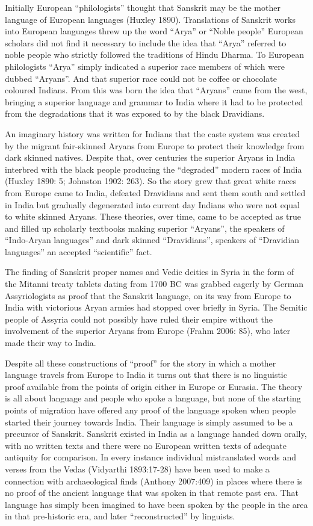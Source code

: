Initially European “philologists” thought that Sanskrit may be the mother language of European languages (Huxley 1890). Translations of Sanskrit works into European languages threw up the word “Arya” or “Noble people” European scholars did not find it necessary to include the idea that “Arya” referred to noble people who strictly followed the traditions of Hindu Dharma. To European philologists “Arya” simply indicated a superior race members of which were dubbed “Aryans”. And that superior race could not be coffee or chocolate coloured Indians. From this was born the idea that “Aryans” came from the west, bringing a superior language and grammar to India where it had to be protected from the degradations that it was exposed to by the black Dravidians. 

\newpage

An imaginary history was written for Indians that the caste system was created by the migrant fair-skinned Aryans from Europe to protect their knowledge from dark skinned natives. Despite that, over centuries the superior Aryans in India interbred with the black people producing the “degraded” modern races of India (Huxley 1890: 5; Johnston 1902: 263). So the story grew that great white races from Europe came to India, defeated Dravidians and sent them south and settled in India but gradually degenerated into current day Indians who were not equal to white skinned Aryans. These theories, over time, came to be accepted as true and filled up scholarly textbooks making superior “Aryans”, the speakers of “Indo-Aryan languages” and dark skinned “Dravidians”, speakers of “Dravidian languages” an accepted “scientific” fact.

The finding of Sanskrit proper names and Vedic deities in Syria in the form of the Mitanni treaty tablets dating from 1700 BC was grabbed eagerly by German Assyriologists as proof that the Sanskrit language, on its way from Europe to India with victorious Aryan armies had stopped over briefly in Syria. The Semitic people of Assyria could not possibly have ruled their empire without the involvement of the superior Aryans from Europe (Frahm 2006: 85), who later made their way to India.

Despite all these constructions of “proof” for the story in which a mother language travels from Europe to India it turns out that there is no linguistic proof available from the points of origin either in Europe or Eurasia. The theory is all about language and people who spoke a language, but none of the starting points of migration have offered any proof of the language spoken when people started their journey towards India. Their language is simply assumed to be a precursor of Sanskrit. Sanskrit existed in India as a language handed down orally, with no written texts and there were no European written texts of adequate antiquity for comparison. In every instance individual mistranslated words and verses from the Vedas (Vidyarthi 1893:17-28) have been used to make a connection with archaeological finds (Anthony 2007:409) in places where there is no proof of the ancient language that was spoken in that remote past era. That language has simply been imagined to have been spoken by the people in the area in that pre-historic era, and later “reconstructed” by linguists.

